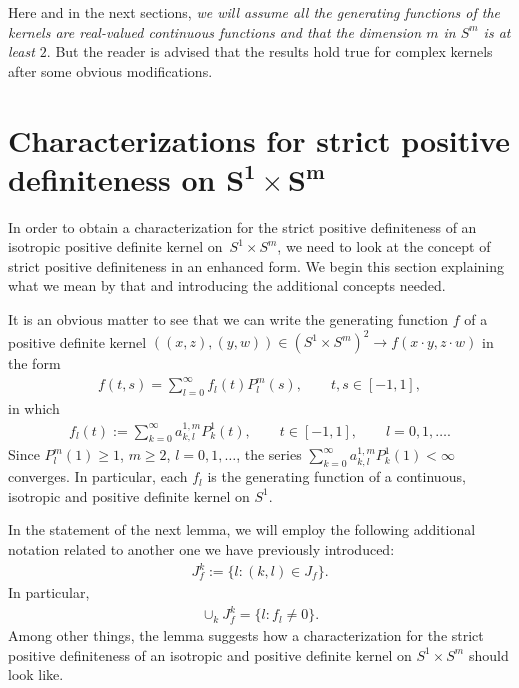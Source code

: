 \documentclass[11pt]{article}
\numberwithin{equation}{section}
\begin{document}
Here and in the next sections, {\em we will assume all the generating functions of the kernels are real-valued continuous functions and that the dimension $m$ in $S^m$ is at least $2$}. But the reader is advised that the results hold true for complex kernels after some obvious modif\/ications.
\setcounter{section}{2}
\setcounter{subsection}{0}
\setcounter{subsubsection}{0}
\setcounter{Theorem}{6}
\setcounter{equation}{0}
\section[Characterizations for strict positive def\/initeness on $S^1 \times S^m$]{Characterizations for strict positive def\/initeness on $\boldsymbol{S^1 \times S^m}$}\label{section3}

In order to obtain a characterization for the strict positive def\/initeness of an isotropic positive def\/inite kernel on~$S^1 \times S^m$, we need to look at the concept of strict positive def\/initeness in an enhanced form. We begin this section explaining what we mean by that and introducing the additional concepts needed.

It is an obvious matter to see that we can write the generating function $f$ of a positive def\/inite kernel $((x,z), (y,w)) \in (S^1 \times S^m)^2 \to f(x \cdot y, z \cdot w)$ in the form
\begin{gather} \label{alter}
f(t,s)=\sum_{l=0}^{\infty}f_l(t)P_{l}^{m}(s), \qquad t,s \in [-1,1],
\end{gather}
in which
\begin{gather*}f_l(t):=\sum_{k=0}^\infty a_{k,l}^{1,m}P_{k}^1(t), \qquad t \in [-1,1],\qquad l=0,1,\ldots.\end{gather*}
Since $P_l^m(1)\geq 1$, $m\geq 2$, $l=0,1,\ldots$, the series $\sum\limits_{k=0}^\infty a_{k,l}^{1,m}P_{k}^1(1)<\infty$ converges. In particular, each $f_l$ is the generating function of a continuous, isotropic and positive def\/inite kernel on $S^1$.

In the statement of the next lemma, we will employ the following additional notation related to another one we have previously introduced:
\begin{gather*}J_{f}^k:=\{l\colon (k,l) \in J_f \}.\end{gather*}
In particular,
\begin{gather*}\cup_{k} J_f^k=\{l\colon f_l\neq 0\}.\end{gather*}
Among other things, the lemma suggests how a characterization for the strict positive def\/ini\-te\-ness of an isotropic and positive def\/inite kernel on $S^1 \times S^m$ should look like.
\end{document}
